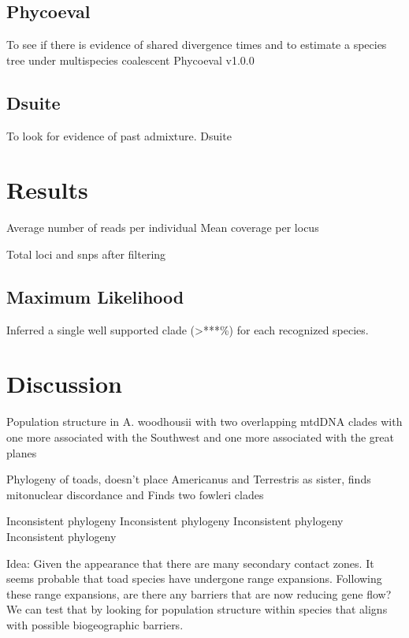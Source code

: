 \subsection{Phycoeval}
To see if there is evidence of shared divergence times and to estimate a species tree under multispecies coalescent
Phycoeval v1.0.0 \parencite{oaks2022} 

\subsection{Dsuite}
To look for evidence of past admixture.
Dsuite \parencite{malinsky2021}


\section{Results}
Average number of reads per individual
Mean coverage per locus

Total loci and snps after filtering

\subsection{Maximum Likelihood}
Inferred a single well supported clade (>***\%) for each recognized species. 




\section{Discussion}


Population structure in A. woodhousii with two overlapping mtdDNA clades 
with one more associated with the Southwest and one more associated with the 
great planes \parencite{masta2003}

Phylogeny of toads, doesn't place Americanus and Terrestris as sister, finds
mitonuclear discordance and Finds two fowleri clades \parencite{fontenot2011}

Inconsistent phylogeny \parencite{masta2002}
Inconsistent phylogeny \parencite{pramuk2007}
Inconsistent phylogeny \parencite{graybeal1997}
Inconsistent phylogeny \parencite{pyron2011}

Idea:
Given the appearance that there are many secondary contact zones. It seems 
probable that toad species have undergone range expansions. Following these
range expansions, are there any barriers that are now reducing gene flow?
We can test that by looking for population structure within species that 
aligns with possible biogeographic barriers.